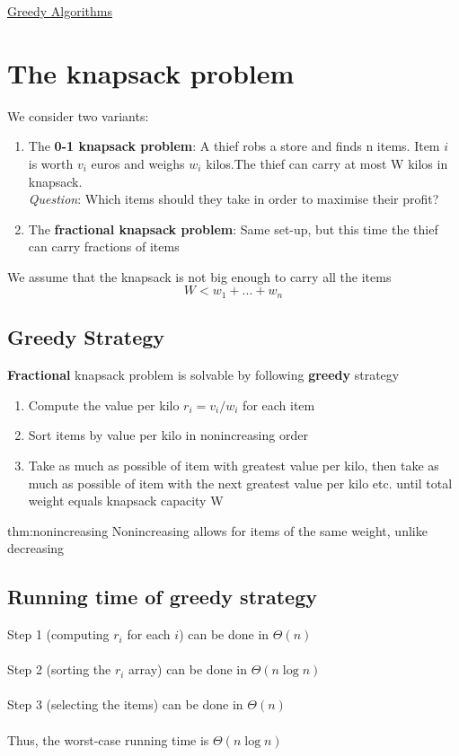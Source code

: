 \documentclass{article}[18pt]
\begin{document}
\begin{center}
\underline{\huge Greedy Algorithms}
\end{center}
\section{The knapsack problem}
We consider two variants:
\begin{enumerate}
	\item The \textbf{0-1 knapsack problem}: A thief robs a store and finds n items. Item $i$ is worth $v_i$ euros and weighs $w_i$ kilos.The thief can carry at most W kilos in knapsack.\\
	\textit{Question}: Which items should they take in order to maximise their profit?
	\item The \textbf{fractional knapsack problem}: Same set-up, but this time the thief can carry fractions of items
\end{enumerate}
We assume that the knapsack is not big enough to carry all the items
$$W< w_1+...+w_n$$
\subsection{Greedy Strategy}
\textbf{Fractional} knapsack problem is solvable by following \textbf{greedy} strategy
\begin{enumerate}
	\item Compute the value per kilo $r_i=v_i/w_i$ for each item
	\item Sort items by value per kilo in nonincreasing order
	\item Take as much as possible of item with greatest value per kilo, then take as much as possible of item with the next greatest value per kilo etc. until total weight equals knapsack capacity W
\end{enumerate}

\begin{theo}[nonincreasing]{thm:nonincreasing}
Nonincreasing allows for items of the same weight, unlike decreasing 
\end{theo}
\subsection{Running time of greedy strategy}
Step 1 (computing $r_i$ for each $i$) can be done in $\Theta(n)$\\
\\
Step 2 (sorting the $r_i$ array) can be done in $\Theta(n\log n)$\\
\\
Step 3 (selecting the items) can be done in $\Theta(n)$\\
\\
Thus, the worst-case running time is $\Theta(n\log n)$
\end{document}
